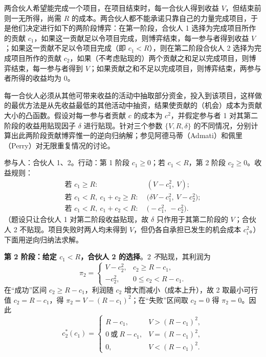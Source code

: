 两合伙人希望能完成一个项目，在项目结束时，每一合伙人得到收益 $V$，但结束前则一无所得，尚需 $R$ 的成本。两合伙人都不能承诺只靠自己的力量完成项目，于是他们决定进行如下的两阶段博弈：在第一阶段，合伙人 1 选择为完成项目所作的贡献 $c_1$，如果这一贡献足以令项目完成，则博弈结束，每一参与者得到收益 $V$；如果这一贡献不足以令项目完成（即 $c_1<R$），则在第二阶段合伙人 2 选择为完成项目所作的贡献 $c_2$，如果（不考虑贴现的）两个贡献之和足以完成项目，则博弈结束，每一参与者得到 $V$；如果贡献之和不足以完成项目，则博弈结束，两参与者所得的收益均为 $0$。

每一合伙人必须从其他可带来收益的活动中抽取部分资金，投入到该项目，这样做的最优方法是从先收益最低的其他活动中抽资，结果使贡献的（机会）成本为贡献大小的凸函数。假设对每一参与者贡献 $c$ 的成本为 $c^2$，并假定参与者 1 对其第二阶段的收益用贴现因子 $\delta$ 进行贴现。针对三个参数 $\{V,R,\delta\}$ 的不同情况，分别计算出此两阶段贡献博弈惟一的逆向归纳解；参见阿德马蒂（Admati）和佩里（Perry）对无限重复情况的讨论。

\sol
参与人：合伙人 1、2。行动：第 1 阶段 $c_1\ge 0$；若 $c_1<R$，第 2 阶段 $c_2\ge 0$。收益规则：
\[
\begin{aligned}
\text{若 }c_1\ge R:\;& (V-c_1^2,\ V);\\
\text{若 }c_1<R,\ c_1+c_2\ge R:\;& \bigl(\delta V-c_1^2,\ V-c_2^2\bigr);\\
\text{若 }c_1<R,\ c_1+c_2<R:\;& \bigl(-c_1^2,\ -c_2^2\bigr).
\end{aligned}
\]\indent
（题设只让合伙人 1 对第二阶段收益贴现，故 $\delta$ 只作用于其第二阶段的 $V$；合伙人 2 不贴现。项目失败时两人均未得到 $V$，但仍各自承担已发生的机会成本 $c_i^2$。）
下面用逆向归纳法求解。

\textbf{第 2 阶段：给定 $c_1<R$，合伙人 2 的选择}。2 \emph{不}贴现，其利润为
\[
\pi_2=
\begin{cases}
V-c_2^2, & c_2\ge R-c_1,\\[4pt]
-c_2^2, & 0\le c_2<R-c_1.
\end{cases}
\]\indent
在“成功”区间 $c_2\ge R-c_1$，利润随 $c_2$ 增大而减小（成本上升），故 2 取最小可行值 $c_2=R-c_1$，得 $\pi_2=V-(R-c_1)^2$；在“失败”区间取 $c_2=0$ 得 $\pi_2=0$。因此
\[
c_2^*(c_1)=
\begin{cases}
R-c_1, & V>(R-c_1)^2,\\[3pt]
0\ \text{或}\ R-c_1, & V=(R-c_1)^2,\\[3pt]
0, & V<(R-c_1)^2.
\end{cases}
\tag{$\dagger$}
\]

